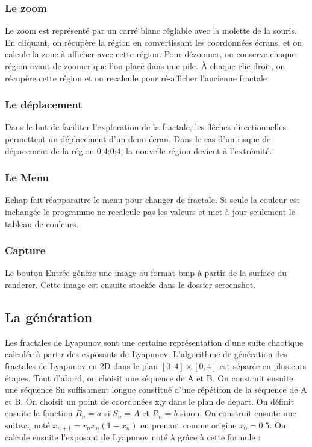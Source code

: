 \documentclass{article}
\begin{document}
    \subsubsection*{Le zoom}

    Le zoom est représenté par un carré blanc réglable avec la molette de la souris.
    En cliquant, on récupère la région en convertissant les coordonnées écrans, et on calcule la zone à afficher avec cette région.
    Pour dézoomer, on conserve chaque région avant de zoomer que l'on place dans une pile.
    À chaque clic droit, on récupère cette région et on recalcule pour ré-afficher l'ancienne fractale


    \subsubsection*{Le déplacement}

    Dans le but de faciliter l'exploration de la fractale, les flêches directionnelles permettent un déplacement d'un demi écran.
    Dans le cas d'un risque de dépacement de la région {0;4;0;4}, la nouvelle région devient à l'extrémité.
    
    \subsubsection*{Le Menu}
    
    Echap fait réapparaitre le menu pour changer de fractale. Si seule la couleur est inchangée le programme ne recalcule pas les valeurs et met à jour seulement le tableau de couleurs.
    
    \subsubsection*{Capture}

    Le bouton Entrée génère une image au format bmp à partir de la surface du renderer. Cette image est ensuite stockée dans le dossier screenshot.

    \subsection*{La génération}
Les fractales de Lyapunov sont une certaine représentation d'une suite chaotique calculée à partir des exposants de Lyapunov.
 L'algorithme de génération des fractales de Lyapunov en 2D dans le plan $[0;4] \times [0,4]$ est séparée en plusieurs étapes. Tout d'abord, on choisit une séquence de A et B.
 On construit ensuite une séquence Sn suffisament longue constitué d'une répétiton de la séquence de A et B.
 On choisit un point de coordonées x,y dans le plan de depart.
 On définit ensuite la fonction $R_n = a$ si $ S_n = A $ et $R_n = b$ sinon.
On construit ensuite une suite$x_n$ noté $x_{{n+1}}=r_{n}x_{n}(1-x_{n})$ en prenant comme origine $x_0 = 0.5$.
On calcule ensuite l'exposant de Lyapunov noté $\lambda$ grâce à cette formule :
\end{document}
